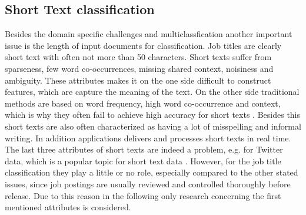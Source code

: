 \documentclass[12pt, a4paper, titlepage]{article}
\begin{document}
\subsection{Short Text classification} 
Besides the domain specific challenges and multiclassfication another important issue is the length of input documents for classification. Job titles are clearly short text with often not more than 50 characters. Short texts suffer from sparseness, few word co-occurrences, missing shared context, noisiness and ambiguity. These attributes makes it on the one side difficult to construct features, which are capture the meaning of the text. On the other side traditional methods are based on word frequency, high word co-occurrence and context, which is why they often fail to achieve high accuracy for short texts \citep{Song2014, WangY2017, WangF2014,  alsmadi2019}. Besides this short texts are also often characterized as having a lot of misspelling and informal writing. In addition applications delivers and processes short texts in real time. The last three attributes of short texts are indeed a problem, e.g. for Twitter data, which is a popular topic for short text data \citep{karimi2013, sriram2010, yan2018}.  However, for the job title classification they play a little or no role, especially compared to the other stated issues, since job postings are usually reviewed and controlled thoroughly before release. Due to this reason in the following only research concerning the first mentioned attributes is considered. 
\end{document}
